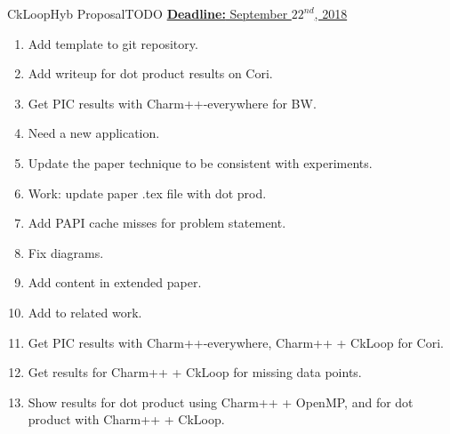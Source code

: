 \begin{frame}{CkLoopHyb Proposal}{TODO}
\underline{\textbf{\small Deadline:} \small September $22^{nd}$, 2018}
\begin{enumerate}
\small \item \small Add template to git repository.
\item \small Add writeup for dot product results on Cori. 
\item \small Get PIC results with Charm++-everywhere for BW. 
\item \small Need a new application.
\item \small Update the paper technique to be consistent with experiments.
\item \small  Work: update paper .tex file with dot prod. 
\item \small  Add PAPI cache misses for problem statement. 
\item \small Fix diagrams.
\item \small Add content in extended paper.
\item \small Add to related work.
\item \small Get PIC results with Charm++-everywhere, Charm++ + CkLoop for Cori.
\item \small Get results for Charm++ + CkLoop for missing data points.
\item \small Show results for dot product using Charm++ + OpenMP, and for dot product with Charm++ + CkLoop. 
\seti 
\end{enumerate}
\end{frame}


